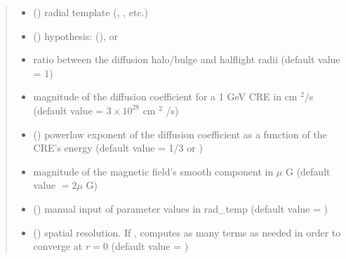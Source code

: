 \documentclass[letterpaper,10pt,english]{sphinxmanual}
\begin{document}
\begin{fulllineitems}
\begin{quote}
\begin{description}
\begin{itemize}
\item {} 
\sphinxAtStartPar
{} () \textendash{} radial template (, , etc.)

\item {} 
\sphinxAtStartPar
{} () \textendash{} hypothesis:  (),  or 

\item {} 
\sphinxAtStartPar
{} \textendash{} ratio between the diffusion halo/bulge and half\sphinxhyphen{}light radii (default value = 1)

\item {} 
\sphinxAtStartPar
{} \textendash{} magnitude of the diffusion coefficient for a 1 GeV CRE in cm \({}^2\)/s (default value = \(3\times 10^{28}\) cm \({}^2\) /s)

\item {} 
\sphinxAtStartPar
{} (\sphinxstyleliteralemphasis{\sphinxupquote{, }}) \textendash{} power\sphinxhyphen{}law exponent of the diffusion coefficient as a function of the CRE’s energy (default value = 1/3 or )

\item {} 
\sphinxAtStartPar
{} \textendash{} magnitude of the magnetic field’s smooth component in \(\mu\) G (default value \(= 2 \mu\) G)

\item {} 
\sphinxAtStartPar
{} () \textendash{} manual input of parameter values in rad\_temp (default value = )

\item {} 
\sphinxAtStartPar
{} () \textendash{} spatial resolution. If , {\hyperref[\detokenize{diffsph:diffsph.pyflux.synch_emissivity}]{}} computes as many terms as needed in order to converge at \(r=0\) (default value = )


\end{itemize}
\end{description}
\end{quote}
\end{fulllineitems}
\end{document}
